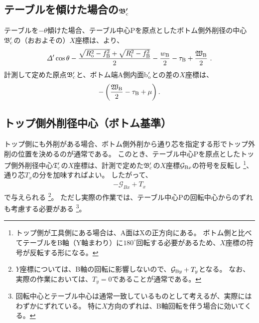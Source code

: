 \subsection[テーブルを傾けた場合の\texorpdfstring{$\mathfrak B_\text c'$}{Bc'}]
           {テーブルを傾けた場合の$\boldsymbol{\mathfrak B_\text c'}$}
テーブルを$-\theta$傾けた場合、テーブル中心Pを原点としたボトム側外削径の中心$\mathfrak B_\text c'$の（おおよその）$X$座標は、より、
\begin{align*}
  \varDelta'\cos\theta-\frac{\sqrt{R_\text o^2-f_\text B^2}+\sqrt{R_\text i^2-f_\text B^2}}2
  -\frac{w_\text B}2-\tau_\text B+\frac{\mathfrak W_\text B}2\ .
\end{align*}
計測して定めた原点$\mathfrak B_\text c'$と、ボトム端A側内面b$_\text o'$との差の$X$座標は、
\begin{align*}
  -\left(\frac{\mathfrak W_\text B}2-\tau_\text B+\mu\right).
\end{align*}


\subsection{トップ側外削径中心（ボトム基準）}
トップ側にも外削がある場合、ボトム側外削から通り芯を指定する形でトップ外削の位置を決めるのが通常である。
このとき、テーブル中心Pを原点としたトップ側外削径中心$\mathfrak T_\text c'$の$X$座標は、計測で定めた$\mathfrak B_\text c'$の$X$座標$\mathcal G_{\text Bx}$の符号を反転し
\footnote{トップ側が工具側にある場合は、A面はXの正方向にある。
ボトム側と比べてテーブルをB軸（Y軸まわり）に$180^\circ$回転する必要があるため、$X$座標の符号が反転する形になる。}、
通り芯$T_x$の分を加味すればよい。
したがって、
\begin{align*}
  -\mathcal G_{Bx}+T_x
\end{align*}
で与えられる
\footnote{$Y$座標については、B軸の回転に影響しないので、$\mathcal G_{\text By}+T_y$となる。
なお、実際の作業においては、$T_y = 0$であることが通常である。}。
ただし実際の作業では、テーブル中心Pの回転中心からのずれも考慮する必要がある
\footnote{回転中心とテーブル中心は通常一致しているものとして考えるが、実際にはわずかにずれている。
特に$X$方向のずれは、B軸回転を伴う場合に効いてくる。}。



